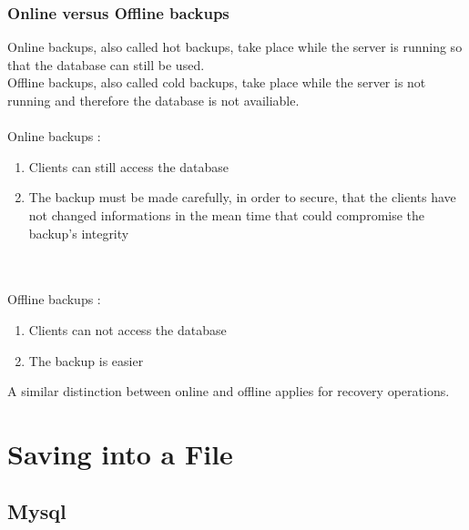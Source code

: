 \documentclass[10pt]{article}
\begin{document}
\subsubsection{Online versus Offline backups}
Online backups, also called hot backups, take place while the server is running so that the database can still be used.\\
Offline backups, also called cold backups, take place while the server is not running and therefore the database is not availiable. \\ \\
Online backups :
\begin{enumerate}
\item Clients can still access the database
\item The backup must be made carefully, in order to secure, that the clients have not changed informations in the mean time that could compromise the backup's integrity
\end{enumerate} \cite{mysqlbackupandrectypesman}\\ \\
Offline backups :
\begin{enumerate}
\item Clients can not access the database
\item The backup is easier
\end{enumerate}
A similar distinction between online and offline applies for recovery operations.
 \cite{mysqlbackupandrectypesman}
\newpage
\section{Saving into a File}
\subsection{Mysql}
\end{document}
